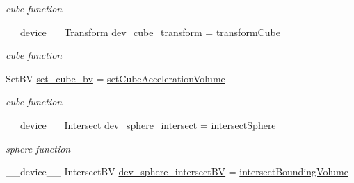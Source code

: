 \begin{DoxyCompactItemize}
\begin{DoxyCompactList}\small\item\em cube function \end{DoxyCompactList}\item 
\+\_\+\+\_\+device\+\_\+\+\_\+ Transform \hyperlink{group__device__pointers_gab1b1881cdcd02a40f59daec059586d68}{dev\+\_\+cube\+\_\+transform} = \hyperlink{group__intersection__test__prperties_ga00e56ff810e7ba397e903acf50626b55}{transform\+Cube}\hypertarget{group__device__pointers_gab1b1881cdcd02a40f59daec059586d68}{}\label{group__device__pointers_gab1b1881cdcd02a40f59daec059586d68}

\begin{DoxyCompactList}\small\item\em cube function \end{DoxyCompactList}\item 
Set\+BV \hyperlink{group__device__pointers_gaec206099dfbd80a9d2e14d71b1fe150f}{set\+\_\+cube\+\_\+bv} = \hyperlink{group__intersection__test__prperties_gabfac85fdf9d0cceb70aefa4c2ed71ad2}{set\+Cube\+Acceleration\+Volume}\hypertarget{group__device__pointers_gaec206099dfbd80a9d2e14d71b1fe150f}{}\label{group__device__pointers_gaec206099dfbd80a9d2e14d71b1fe150f}

\begin{DoxyCompactList}\small\item\em cube function \end{DoxyCompactList}\item 
\+\_\+\+\_\+device\+\_\+\+\_\+ Intersect \hyperlink{group__device__pointers_ga8f39c98f1f65e4214ac0e5daa8806611}{dev\+\_\+sphere\+\_\+intersect} = \hyperlink{group__intersection__test__prperties_ga8c05ac13c3cdd49f7e4fa3948cfa4699}{intersect\+Sphere}\hypertarget{group__device__pointers_ga8f39c98f1f65e4214ac0e5daa8806611}{}\label{group__device__pointers_ga8f39c98f1f65e4214ac0e5daa8806611}

\begin{DoxyCompactList}\small\item\em sphere function \end{DoxyCompactList}\item 
\+\_\+\+\_\+device\+\_\+\+\_\+ Intersect\+BV \hyperlink{group__device__pointers_ga10dd7617749ee8f0f1766add06b56943}{dev\+\_\+sphere\+\_\+intersect\+BV} = \hyperlink{group__intersection__test__prperties_gaf6bbee9e8a6ee564017fa94cd9e6ec63}{intersect\+Bounding\+Volume}\hypertarget{group__device__pointers_ga10dd7617749ee8f0f1766add06b56943}{}\label{group__device__pointers_ga10dd7617749ee8f0f1766add06b56943}


\end{DoxyCompactItemize}
